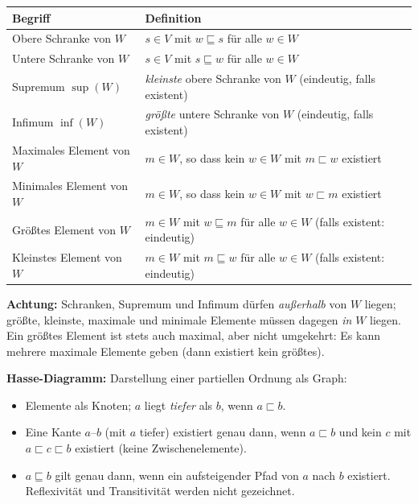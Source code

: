 \medskip
\begin{center}
\renewcommand{\arraystretch}{1.6}
\begin{tabularx}{\textwidth}{l X}
\textbf{Begriff} & \textbf{Definition} \\
\hline
Obere Schranke von $W$ & $s \in V$ mit $w \sqsubseteq s$ für alle $w \in W$ \\
Untere Schranke von $W$ & $s \in V$ mit $s \sqsubseteq w$ für alle $w \in W$ \\
Supremum $\sup(W)$ & \emph{kleinste} obere Schranke von $W$ (eindeutig, falls existent) \\
Infimum $\inf(W)$ & \emph{größte} untere Schranke von $W$ (eindeutig, falls existent) \\
Maximales Element von $W$ & $m \in W$, so dass kein $w \in W$ mit $m \sqsubset w$ existiert \\
Minimales Element von $W$ & $m \in W$, so dass kein $w \in W$ mit $w \sqsubset m$ existiert \\
Größtes Element von $W$ & $m \in W$ mit $w \sqsubseteq m$ für alle $w \in W$ (falls existent: eindeutig) \\
Kleinstes Element von $W$ & $m \in W$ mit $m \sqsubseteq w$ für alle $w \in W$ (falls existent: eindeutig) \\
\end{tabularx}
\end{center}

\medskip
\noindent\textbf{Achtung:} Schranken, Supremum und Infimum dürfen \emph{außerhalb} von $W$ liegen; größte, kleinste, maximale und minimale Elemente müssen dagegen \emph{in} $W$ liegen. Ein größtes Element ist stets auch maximal, aber nicht umgekehrt: Es kann mehrere maximale Elemente geben (dann existiert kein größtes).

\medskip
\noindent\textbf{Hasse-Diagramm:} Darstellung einer partiellen Ordnung als Graph:
\begin{itemize}
  \item Elemente als Knoten; $a$ liegt \emph{tiefer} als $b$, wenn $a \sqsubset b$.
  \item Eine Kante $a$--$b$ (mit $a$ tiefer) existiert genau dann, wenn $a \sqsubset b$ und kein $c$ mit $a \sqsubset c \sqsubset b$ existiert (keine Zwischenelemente).
  \item $a \sqsubseteq b$ gilt genau dann, wenn ein aufsteigender Pfad von $a$ nach $b$ existiert. Reflexivität und Transitivität werden nicht gezeichnet.
\end{itemize}

